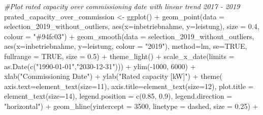 \documentclass[a4paper,11pt]{article}
\newenvironment{Shaded}{\begin{snugshade}}{\end{snugshade}}
\newcommand{\AttributeTok}[1]{\textcolor[rgb]{0.77,0.63,0.00}{#1}}
\newcommand{\CommentTok}[1]{\textcolor[rgb]{0.56,0.35,0.01}{\textit{#1}}}
\newcommand{\ConstantTok}[1]{\textcolor[rgb]{0.00,0.00,0.00}{#1}}
\newcommand{\DecValTok}[1]{\textcolor[rgb]{0.00,0.00,0.81}{#1}}
\newcommand{\FloatTok}[1]{\textcolor[rgb]{0.00,0.00,0.81}{#1}}
\newcommand{\FunctionTok}[1]{\textcolor[rgb]{0.00,0.00,0.00}{#1}}
\newcommand{\NormalTok}[1]{#1}
\newcommand{\OtherTok}[1]{\textcolor[rgb]{0.56,0.35,0.01}{#1}}
\newcommand{\SpecialCharTok}[1]{\textcolor[rgb]{0.00,0.00,0.00}{#1}}
\newcommand{\StringTok}[1]{\textcolor[rgb]{0.31,0.60,0.02}{#1}}
\begin{document}
\begin{Shaded}
\begin{Highlighting}[]
\CommentTok{\#Plot rated capacity over commissioning date with linear trend 2017 {-} 2019}
\NormalTok{prated\_capacity\_over\_commission }\OtherTok{\textless{}{-}} \FunctionTok{ggplot}\NormalTok{() }\SpecialCharTok{+}
  \FunctionTok{geom\_point}\NormalTok{(}\AttributeTok{data =}\NormalTok{ selection\_2019\_without\_outliers, }
             \FunctionTok{aes}\NormalTok{(}\AttributeTok{x=}\NormalTok{inbetriebnahme, }\AttributeTok{y=}\NormalTok{leistung), }
             \AttributeTok{size =} \FloatTok{0.4}\NormalTok{, }\AttributeTok{colour =} \StringTok{"\#94fc03"}\NormalTok{) }\SpecialCharTok{+}
  \FunctionTok{geom\_smooth}\NormalTok{(}\AttributeTok{data =}\NormalTok{ selection\_2019\_without\_outliers, }
              \FunctionTok{aes}\NormalTok{(}\AttributeTok{x=}\NormalTok{inbetriebnahme, }\AttributeTok{y=}\NormalTok{leistung, }\AttributeTok{colour =} \StringTok{"2019"}\NormalTok{),}
              \AttributeTok{method=}\NormalTok{lm, }\AttributeTok{se=}\ConstantTok{TRUE}\NormalTok{, }\AttributeTok{fullrange =} \ConstantTok{TRUE}\NormalTok{, }\AttributeTok{size =} \FloatTok{0.5}\NormalTok{)  }\SpecialCharTok{+}
  \FunctionTok{theme\_light}\NormalTok{() }\SpecialCharTok{+}
  \FunctionTok{scale\_x\_date}\NormalTok{(}\AttributeTok{limits =} \FunctionTok{as.Date}\NormalTok{(}\FunctionTok{c}\NormalTok{(}\StringTok{"1990{-}01{-}01"}\NormalTok{,}\StringTok{"2030{-}12{-}31"}\NormalTok{))) }\SpecialCharTok{+}
  \FunctionTok{ylim}\NormalTok{(}\SpecialCharTok{{-}}\DecValTok{1000}\NormalTok{, }\DecValTok{6000}\NormalTok{) }\SpecialCharTok{+}
  \FunctionTok{xlab}\NormalTok{(}\StringTok{"Commissioning Date"}\NormalTok{) }\SpecialCharTok{+}
  \FunctionTok{ylab}\NormalTok{(}\StringTok{"Rated capacity [kW]"}\NormalTok{) }\SpecialCharTok{+}
  \FunctionTok{theme}\NormalTok{( }\AttributeTok{axis.text=}\FunctionTok{element\_text}\NormalTok{(}\AttributeTok{size=}\DecValTok{11}\NormalTok{),}
         \AttributeTok{axis.title=}\FunctionTok{element\_text}\NormalTok{(}\AttributeTok{size=}\DecValTok{12}\NormalTok{),}
         \AttributeTok{plot.title =} \FunctionTok{element\_text}\NormalTok{(}\AttributeTok{size=}\DecValTok{14}\NormalTok{),}
         \AttributeTok{legend.position =} \FunctionTok{c}\NormalTok{(}\FloatTok{0.85}\NormalTok{, }\FloatTok{0.9}\NormalTok{),}
         \AttributeTok{legend.direction =} \StringTok{"horizontal"}\NormalTok{) }\SpecialCharTok{+}
  \FunctionTok{geom\_hline}\NormalTok{(}\AttributeTok{yintercept =} \DecValTok{3500}\NormalTok{, }\AttributeTok{linetype =} \StringTok{\textquotesingle{}dashed\textquotesingle{}}\NormalTok{, }\AttributeTok{size =} \FloatTok{0.25}\NormalTok{) }\SpecialCharTok{+}

\end{Highlighting}
\end{Shaded}
\end{document}

